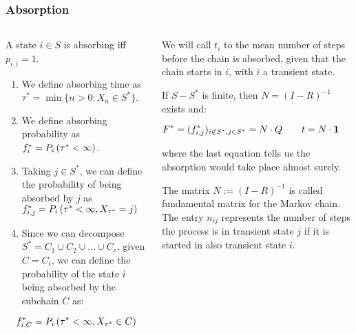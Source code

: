 \begin{frame} \frametitle{Absorption}
    \vspace{2em}
    
    \begin{columns}
    \begin{column}{0.5\textwidth}

        \begin{definition}
        A state \(i\in S\) is absorbing iff \(p_{i,i} = 1\).
        \end{definition}
    
        \begin{definition}
        \begin{enumerate}
        \item We define absorbing time as \(\tau^{\ast} = \min \{n > 0: X_n \in S^{\ast}\}\).
        \item We define absorbing probability as \(f_{i}^{\ast} = P_i\left({\tau^{\ast} < \infty}\right)\).
        \item Taking \(j\in S^{\ast}\), we can define the probability of being absorbed by \(j\) as \(f_{i,j}^{\ast} = P_i\left({\tau^{\ast} < \infty, X_{\tau^{\ast}} = j}\right)\)
        \item Since we can decompose \(S^{\ast} = C_1 \cup C_2 \cup \ldots \cup C_r\), given \(C = C_i\), we can define the probability of the state \(i\) being absorbed by the subchain \(C\) as:
        \end{enumerate}

        \[
        f_{i,C}^{\ast} = P_i\left({\tau^{\ast} < \infty, X_{\tau^{\ast}} \in C}\right)
        \]
        \end{definition}
    \end{column}
    \begin{column}{0.5\textwidth}
        \begin{definition}
        We will call \(t_i\) to the mean number of steps before the chain is absorbed, given that 
        the chain starts in \(i\), with \(i\) a transient state.
        \end{definition}
        
        \begin{proposition}
        If \(S - S^{\ast}\) is finite, then \(N = (I - R)^{-1}\) exists and:

        \[
        F^{\ast} = (f_{i,j}^{\ast})_{i \not\in S^{\ast}, j \in S^{\ast}} = N\cdot Q \qquad 
        t = N \cdot \mathbf{1} \qquad
        f_i^{\ast} = 1
        \]

        where the last equation tells us the absorption would take place almost surely.
        \end{proposition}
        
        \begin{definition}
        The matrix \(N := (I - R)^{-1}\) is called fundamental matrix for the Markov chain. 
        The entry \(n_{ij}\) represents the number of steps the process is in transient state \(j\) 
        if it is started in also transient state \(i\).
        \end{definition}
    \end{column}
    \end{columns}
 \end{frame}



